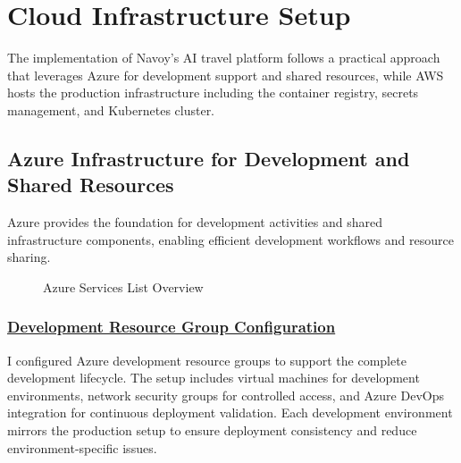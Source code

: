 \section{Cloud Infrastructure Setup}
The implementation of Navoy's AI travel platform follows a practical approach that leverages Azure for development support and shared resources, while AWS hosts the production infrastructure including the container registry, secrets management, and Kubernetes cluster.

\subsection{Azure Infrastructure for Development and Shared Resources}
Azure provides the foundation for development activities and shared infrastructure components, enabling efficient development workflows and resource sharing.

\begin{figure}[H]
    \centering
    \caption{Azure Services List Overview}
    \label{fig:azure-services-list}
\end{figure}

\subsubsection*{\underline{Development Resource Group Configuration}}
I configured Azure development resource groups to support the complete development lifecycle. The setup includes virtual machines for development environments, network security groups for controlled access, and Azure DevOps integration for continuous deployment validation. Each development environment mirrors the production setup to ensure deployment consistency and reduce environment-specific issues.

